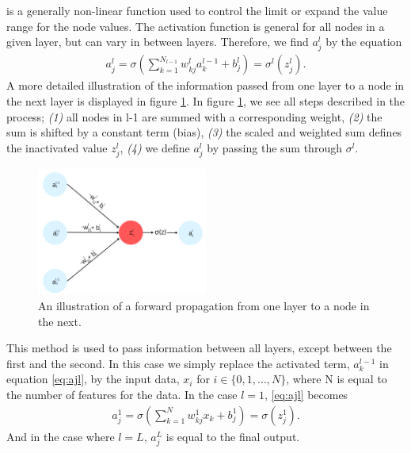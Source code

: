 is a generally non-linear function used to control the limit or expand the value range for the node values. The activation 
function is general for all nodes in a given layer, but can vary in between layers. Therefore,
we find $a_j^l$ by the equation
\begin{align}\label{eq:ajl}
    a_j^l = \sigma \left (\sum_{k=1} ^ {N_{l-1}} w_{kj}^la_k^{l-1} + b^l_j\right ) = \sigma^l(z_j^l).
\end{align}
A more detailed illustration of the information passed from one layer to a node in the next layer is displayed 
in figure \ref{fig:WB}. In figure \ref{fig:WB}, we see all steps described in the process; \emph{(1)} all nodes in 
l-1 are summed with a corresponding weight, \emph{(2)} the sum is shifted by a constant term (bias), \emph{(3)} the 
scaled and weighted sum defines the inactivated value $z_j^l$, \emph{(4)} we define $a^l_j$ by passing the 
sum through $\sigma^l$.  
\begin{figure}
    \centering
    \includegraphics[width=0.5\textwidth]{Figures/Illustrations/WeightBias.png}
    \caption{An illustration of a forward propagation from one layer to a node in the next.}
    \label{fig:WB}
\end{figure}
This method is used to pass information between all layers, except between the first and the second. 
In this case we simply replace the activated term, $a_k^{l-1}$ in equation \ref{eq:ajl}, by the input data,
$x_i$ for $i\in\{0,1,...,N\}$, where N is equal to the number of features for the data. In the case $l=1$, \ref{eq:ajl} 
becomes
\begin{align}
    a_j^1 = \sigma \left (\sum_{k=1} ^ {N} w_{kj}^1x_k + b^1_j\right ) = \sigma(z_j^1).
\end{align}
And in the case where $l=L$, $a_j^L$ is equal to the final output. 
